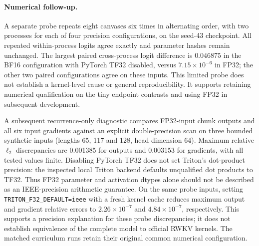 \paragraph{Numerical follow-up.}
A separate probe repeats eight canvases six times in alternating order, with two processes for each of four precision configurations, on the seed-43 checkpoint. All repeated within-process logits agree exactly and parameter hashes remain unchanged. The largest paired cross-process logit difference is $0.046875$ in the BF16 configuration with PyTorch TF32 disabled, versus $7.15\times10^{-6}$ in FP32; the other two paired configurations agree on these inputs. This limited probe does not establish a kernel-level cause or general reproducibility. It supports retaining numerical qualification on the tiny endpoint contrasts and using FP32 in subsequent development.

A subsequent recurrence-only diagnostic compares FP32-input chunk outputs and all six input gradients against an explicit double-precision scan on three bounded synthetic inputs (lengths 65, 117 and 128, head dimension 64). Maximum relative $\ell_2$ discrepancies are 0.001385 for outputs and 0.003153 for gradients, with all tested values finite. Disabling PyTorch TF32 does not set Triton's dot-product precision: the inspected local Triton backend defaults unqualified dot products to TF32. Thus FP32 parameter and activation dtypes alone should not be described as an IEEE-precision arithmetic guarantee. On the same probe inputs, setting \texttt{TRITON\_F32\_DEFAULT=ieee} with a fresh kernel cache reduces maximum output and gradient relative errors to $2.26\times10^{-7}$ and $4.84\times10^{-7}$, respectively. This supports a precision explanation for these probe discrepancies; it does not establish equivalence of the complete model to official RWKV kernels. The matched curriculum runs retain their original common numerical configuration.




